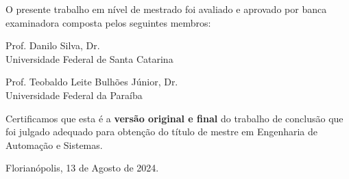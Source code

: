 
\begin{folhadeaprovacao}
	
	\begin{center}
		{\ABNTEXchapterfont\large\imprimirautor}
		
		\begin{center}
			\ABNTEXchapterfont\bfseries\large\imprimirtitulo
		\end{center}
		
		O presente trabalho em nível de mestrado foi avaliado e aprovado por banca examinadora composta pelos seguintes membros: 
		
		\vspace*{0.5cm}

		Prof. Danilo Silva, Dr. \\
		Universidade Federal de Santa Catarina  \\
		\vspace*{0.5cm}

		Prof. Teobaldo Leite Bulhões Júnior, Dr. \\
		Universidade Federal da Paraíba \\
		\vspace*{0.5cm}

		\vspace*{1cm}
		
		Certificamos que esta é a \textbf{versão original e final} do trabalho de conclusão que foi julgado adequado para obtenção do título de mestre em Engenharia de Automação e Sistemas.
		
		\vspace*{0.5cm}
		\vspace*{0.5cm}
	\end{center}
	
	\begin{center}
		\vspace*{\fill}

		Florianópolis, 13 de Agosto de 2024.
		\vspace*{1cm}
	\end{center}
	
\end{folhadeaprovacao}

